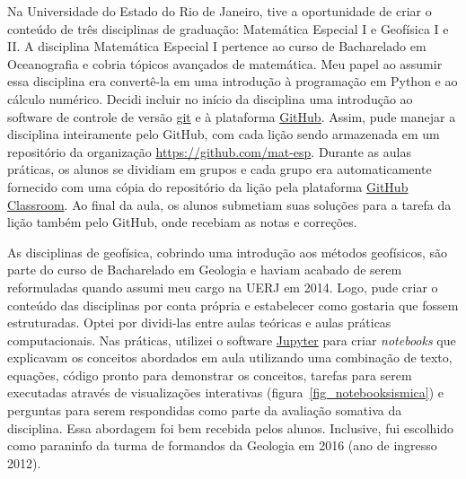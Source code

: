\documentclass[10pt,a4paper,oneside]{book}
\newcommand{\UERJ}{Universidade do Estado do Rio de Janeiro}
\begin{document}
Na \UERJ{}, tive a oportunidade de criar o conteúdo de três disciplinas de
graduação: Matemática Especial I e Geofísica I e II.
A disciplina Matemática Especial I pertence ao curso de Bacharelado em
Oceanografia e cobria tópicos avançados de matemática.
Meu papel ao assumir essa disciplina era convertê-la em uma introdução à
programação em Python e ao cálculo numérico.
Decidi incluir no início da disciplina uma introdução ao software de controle
de versão \href{https://git-scm.com/}{git} e à plataforma
\href{https://github.com/}{GitHub}.
Assim, pude manejar a disciplina inteiramente pelo GitHub, com cada lição
sendo armazenada em um repositório da organização
\url{https://github.com/mat-esp}.
Durante as aulas práticas, os alunos se dividiam em grupos e cada grupo era
automaticamente fornecido com uma cópia do repositório da lição pela plataforma
\href{https://classroom.github.com/}{GitHub Classroom}.
Ao final da aula, os alunos submetiam suas soluções para a tarefa da lição
também pelo GitHub, onde recebiam as notas e correções.

As disciplinas de geofísica, cobrindo uma introdução aos métodos geofísicos,
são parte do curso de Bacharelado em Geologia e haviam acabado de serem
reformuladas quando assumi meu cargo na UERJ em 2014.
Logo, pude criar o conteúdo das disciplinas por conta própria e estabelecer
como gostaria que fossem estruturadas.
Optei por dividi-las entre aulas teóricas e aulas práticas computacionais.
Nas práticas, utilizei o software \href{https://jupyter.org/}{Jupyter} para
criar \textit{notebooks} que explicavam os conceitos abordados em aula
utilizando uma combinação de texto, equações, código pronto para demonstrar os
conceitos, tarefas para serem executadas através de visualizações interativas
(figura~\ref{fig_notebooksismica}) e perguntas para serem respondidas como
parte da avaliação somativa da disciplina.
Essa abordagem foi bem recebida pelos alunos.
Inclusive, fui escolhido como paraninfo da turma de formandos da Geologia em
2016 (ano de ingresso 2012).
\end{document}
